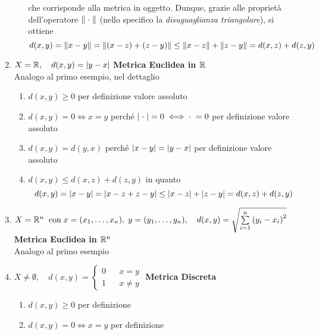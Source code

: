 \begin{example}
\begin{enumerate}
\begin{enumerate}[label=\arabic*]
					che corrisponde alla metrica in oggetto. Dunque, grazie alle proprietà dell'operatore $\left\|\;\cdot\;\right\|$ (nello specifico la \textit{disuguaglianza triangolare}), si ottiene
					$$d(x,y) = \left\|x-y\right\| = \left\|(x-z) + (z-y)\right\| \leq \left\|x-z\right\| + \left\|z-y\right\| = d(x,z) + d(z,y)$$
					\begin{center}
					\end{center}
			\end{enumerate}
		\item $X=\mathbb{R},\quad d(x,y)=\left|y-x\right|$ \hfill {\footnotesize\textbf{Metrica Euclidea in $\mathbb{R}$}}\\
			Analogo al primo esempio, nel dettaglio
			\begin{enumerate}[label=\arabic*.]
				\item $d(x,y) \geq 0$ per definizione valore assoluto
				\item $d(x,y) = 0 \iff x = y$ perché $\left|\;\cdot\;\right| = 0 \iff \cdot\; = 0$ per definizione valore assoluto
				\item $d(x,y)=d(y,x)$ perché $\left|x - y\right| = \left|y - x\right|$ per definizione valore assoluto
				\item $d(x,y) \leq d(x,z) + d(z,y)$ in quanto
					$$d(x,y) = \left|x-y\right| = \left|x-z+z-y\right| \leq \left|x-z\right| + \left|z-y\right| = d(x,z) + d(z,y)$$
			\end{enumerate}
		\item $X=\mathbb{R}^n \;\; \text{con}\; x=(x_1,\ldots,x_n),\; y=(y_1,\ldots,y_n),\quad d(x,y)=\sqrt{\sum\limits_{i=1}^{n}{\left(y_i-x_i\right)}^2}$ \hfill {\footnotesize\textbf{Metrica Euclidea in $\mathbb{R}^n$}} \label{ex:dist_eucl}\\
			Analogo al primo esempio
		\item $X\ne \emptyset,\quad d(x,y)= \left\{\begin{matrix}0&&x=y\\1&&x \ne y\end{matrix}\right.$ \hfill {\footnotesize\textbf{Metrica Discreta}}\\
			\begin{enumerate}[label=\arabic*.]
				\item $d(x,y) \geq 0$ per definizione
				\item $d(x,y) = 0 \iff x = y$ per definizione

\end{enumerate}
\end{enumerate}
\end{example}
